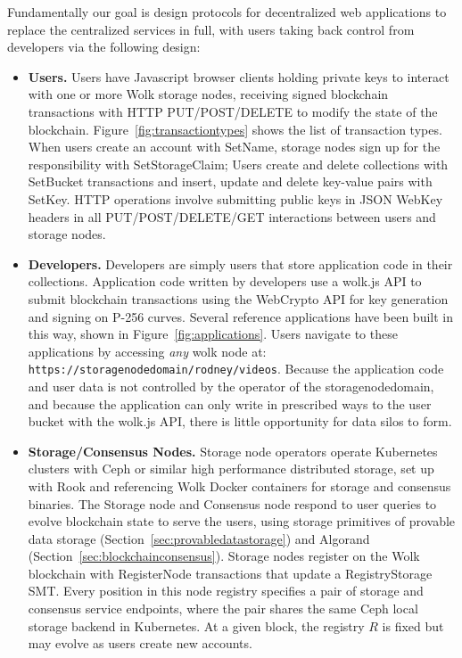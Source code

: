 \documentclass[journal]{IEEEtran}
\newcommand{\tx}[1]{\textsf{#1}}
\begin{document}
Fundamentally our goal is design protocols for decentralized web applications to replace the centralized services in full, with users taking back control from developers via the following design:
\begin{itemize}
\item {\bf Users.} Users have Javascript browser clients holding private keys to interact with one or more Wolk storage nodes, receiving signed blockchain transactions with HTTP PUT/POST/DELETE to modify the state of the blockchain.  Figure~\ref{fig:transactiontypes} shows the list of transaction types.   When users create an account with \tx{SetName}, storage nodes sign up for the responsibility with \tx{ SetStorageClaim};  Users create and delete collections with \tx{ SetBucket} transactions and insert, update and delete key-value pairs with \tx{ SetKey}.  HTTP operations involve submitting public keys in JSON WebKey headers in all PUT/POST/DELETE/GET interactions between users and storage nodes.

\item {\bf Developers.}  Developers are simply users that store application code in their collections.  Application code written by developers use a wolk.js API to submit blockchain transactions using the WebCrypto API for key generation and signing on P-256 curves.   Several reference applications have been built in this way, shown in Figure~\ref{fig:applications}.  Users navigate to these applications by accessing {\em any} wolk node at: {\tt https://storagenodedomain/rodney/videos}.  Because the application code and user data is not controlled by the operator of the \tx{storagenodedomain}, and because the application can only write in prescribed ways to the user bucket with the wolk.js API, there is little opportunity for data silos to form.

\item {\bf Storage/Consensus Nodes.} Storage node operators operate Kubernetes clusters with Ceph \cite{Weil:2006:CSH:1298455.1298485} or similar high performance distributed storage, set up with Rook and referencing Wolk Docker containers for storage and consensus binaries.   The Storage node and Consensus node respond to user queries to evolve blockchain state to serve the users, using storage primitives of provable data storage (Section~\ref{sec:provabledatastorage}) and Algorand (Section~\ref{sec:blockchainconsensus}).   Storage nodes  register on the Wolk blockchain with \tx{RegisterNode} transactions that update a RegistryStorage SMT.   Every position in this node registry specifies a pair of storage and consensus service endpoints, where the pair shares the same Ceph local storage backend in Kubernetes.  At a given block, the registry $R$ is fixed but may evolve as users create new accounts.


\end{itemize}
\end{document}
